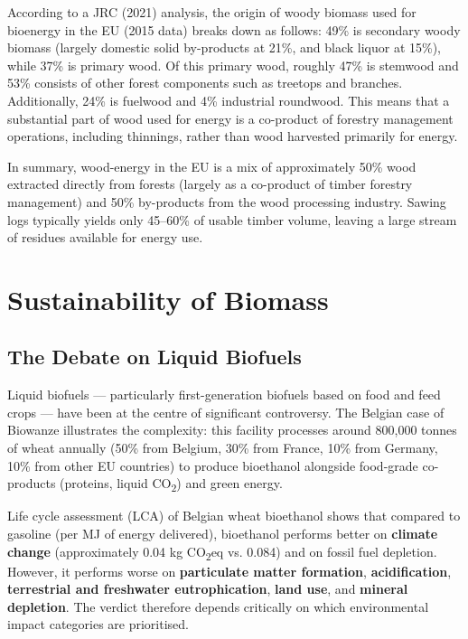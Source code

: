 According to a JRC (2021) analysis, the origin of woody biomass used for bioenergy in the EU (2015 data) breaks down as follows: 49\% is secondary woody biomass (largely domestic solid by-products at 21\%, and black liquor at 15\%), while 37\% is primary wood. Of this primary wood, roughly 47\% is stemwood and 53\% consists of other forest components such as treetops and branches. Additionally, 24\% is fuelwood and 4\% industrial roundwood. This means that a substantial part of wood used for energy is a co-product of forestry management operations, including thinnings, rather than wood harvested primarily for energy.

In summary, wood-energy in the EU is a mix of approximately 50\% wood extracted directly from forests (largely as a co-product of timber forestry management) and 50\% by-products from the wood processing industry. Sawing logs typically yields only 45–60\% of usable timber volume, leaving a large stream of residues available for energy use.

\section{Sustainability of Biomass}

\subsection{The Debate on Liquid Biofuels}

Liquid biofuels — particularly first-generation biofuels based on food and feed crops — have been at the centre of significant controversy. The Belgian case of Biowanze illustrates the complexity: this facility processes around 800,000 tonnes of wheat annually (50\% from Belgium, 30\% from France, 10\% from Germany, 10\% from other EU countries) to produce bioethanol alongside food-grade co-products (proteins, liquid CO\textsubscript{2}) and green energy.

Life cycle assessment (LCA) of Belgian wheat bioethanol shows that compared to gasoline (per MJ of energy delivered), bioethanol performs better on \textbf{climate change} (approximately 0.04 kg CO\textsubscript{2}eq vs. 0.084) and on fossil fuel depletion. However, it performs worse on \textbf{particulate matter formation}, \textbf{acidification}, \textbf{terrestrial and freshwater eutrophication}, \textbf{land use}, and \textbf{mineral depletion}. The verdict therefore depends critically on which environmental impact categories are prioritised.

